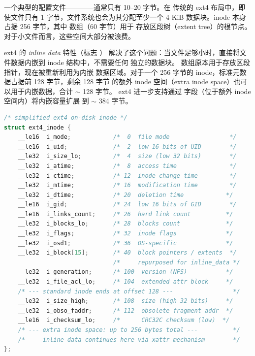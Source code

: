 \begin{filesystemlayout}
一个典型的配置文件————通常只有 10--20 字节。在
传统的 ext4 布局中，即使文件只有 1 字节，文件系统也会为其分配至少一个 4 KiB
数据块。inode 本身占据 256 字节，其中  数组（60 字节）用于
存放区段树（extent tree）的根节点。对于小文件而言，这些空间大部分被浪费。

ext4 的 \emph{inline data} 特性（标志 ）
解决了这个问题：当文件足够小时，直接将文件数据内嵌到 inode 结构中，不需要任何
独立的数据块。 数组原本用于存放区段指针，现在被重新利用为内嵌
数据区域。对于一个 256 字节的 inode，标准元数据占据前 128 字节，剩余 128 字节
的额外 inode 空间（extra inode space）也可以用于内嵌数据，合计 $\sim$ 128 字节。
ext4 进一步支持通过  字段（位于额外 inode 空间内）将内嵌容量扩展
到 $\sim$ 384 字节。

\begin{lstlisting}[language=C]
/* simplified ext4 on-disk inode */
struct ext4_inode {
    __le16  i_mode;            /*  0  file mode                 */
    __le16  i_uid;             /*  2  low 16 bits of UID        */
    __le32  i_size_lo;         /*  4  size (low 32 bits)        */
    __le32  i_atime;           /*  8  access time               */
    __le32  i_ctime;           /* 12  inode change time         */
    __le32  i_mtime;           /* 16  modification time         */
    __le32  i_dtime;           /* 20  deletion time            */
    __le16  i_gid;             /* 24  low 16 bits of GID        */
    __le16  i_links_count;     /* 26  hard link count          */
    __le32  i_blocks_lo;       /* 28  blocks count             */
    __le32  i_flags;           /* 32  inode flags              */
    __le32  i_osd1;            /* 36  OS-specific              */
    __le32  i_block[15];       /* 40  block pointers / extents  */
                               /*     repurposed for inline_data */
    __le32  i_generation;      /* 100  version (NFS)           */
    __le32  i_file_acl_lo;     /* 104  extended attr block     */
    /* --- standard inode ends at offset 128 ---                 */
    __le32  i_size_high;       /* 108  size (high 32 bits)     */
    __le32  i_obso_faddr;      /* 112  obsolete fragment addr  */
    __le16  i_checksum_lo;     /*      CRC32C checksum (low)  */
    /* --- extra inode space: up to 256 bytes total ---          */
    /*     inline data continues here via xattr mechanism        */
};
\end{lstlisting}


\end{filesystemlayout}
